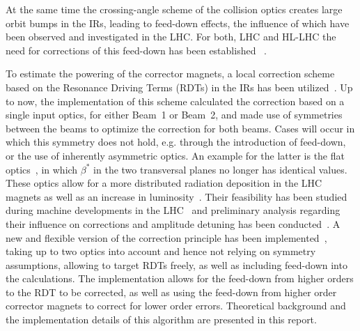 At the same time the crossing-angle scheme of the collision optics creates large orbit bumps in the IRs,
leading to feed-down effects, the influence of which have been observed and investigated in the LHC.
For both, LHC and HL-LHC the need for corrections of this feed-down has been established
~\cite{MacleanNewMethodsMeasurement2017,
MacleanDetailedReviewLHC2019, 
MacleanNewApproachLHC2019,
MacleanProspectsBeambasedStudy2022,
MacleanFirstMeasurementCorrection2015,
MacleanNonlinearOpticsCommissioning2016,
MacleanLHCMD21712018, 
BuffatOpticsMeasurementCorrection2022}.


To estimate the powering of the corrector magnets, a local correction scheme
based on the Resonance Driving Terms (RDTs) in the IRs has been 
utilized~\cite{BruningDynamicApertureStudies2004}. 
Up to now, the implementation of this scheme calculated the correction based on a single input optics, 
for either Beam~1 or Beam~2, and made use of symmetries between the beams to optimize the correction for both beams. 
Cases will occur in which this symmetry does not hold, e.g. through the introduction of feed-down, or the use of inherently asymmetric optics.
An example for the latter is the flat optics~\cite{FartoukhAchromaticTelescopicSqueezing2013,FartoukhFlatTelescopicOptics2018},
in which $\beta^*$ in the two transversal planes no longer has identical values. 
These optics allow for a more distributed radiation deposition in the LHC magnets as well as an increase 
in luminosity~\cite{FartoukhFlatTelescopicOptics2018}.
Their feasibility has been studied during machine developments in the LHC~\cite{FartoukhFirstHighIntensityBeam2019}
and preliminary analysis regarding their influence on corrections and amplitude detuning has been conducted~\cite{DillyCorrectionAmpDet2018}.
A new and flexible version of the correction principle has been implemented~\cite{OMC-TeamIRNLRDTCorrection}, 
taking up to two optics into account and hence not relying on symmetry assumptions, allowing to target RDTs freely,
as well as including feed-down into the calculations. 
The implementation allows for the feed-down from higher orders to the RDT to be corrected, 
as well as using the feed-down from higher order corrector magnets to correct for lower order errors.
Theoretical background and the implementation details of this algorithm are presented in this report.

